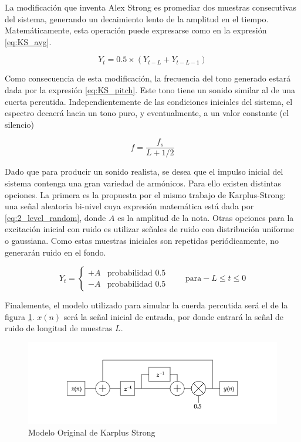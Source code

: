 La modificación que inventa Alex Strong es promediar dos muestras consecutivas del sistema, generando un decaimiento lento de la amplitud en el tiempo. Matemáticamente, esta operación puede expresarse como en la expresión \eqref{eq:KS_avg}.

\begin{equation}
    Y_t = 0.5\times \left(Y_{t-L}+Y_{t-L-1}\right)
    \label{eq:KS_avg}
\end{equation}

Como consecuencia de esta modificación, la frecuencia del tono generado estará dada por la expresión \eqref{eq:KS_pitch}. Este tono tiene un sonido similar al de una cuerta percutida. Independientemente de las condiciones iniciales del sistema, el espectro decaerá hacia un tono puro, y eventualmente, a un valor constante (el silencio)

\begin{equation}
    f = \frac{f_s}{L+1/2}
    \label{eq:KS_pitch}
\end{equation}

Dado que para producir un sonido realista, se desea que el impulso inicial del sistema contenga una gran variedad de armónicos. Para ello existen distintas opciones. La primera es la propuesta por el mismo trabajo de Karplus-Strong: una señal aleatoria bi-nivel cuya expresión matemática está dada por \eqref{eq:2_level_random}, donde $A$ es la amplitud de la nota. Otras opciones para la excitación inicial con ruido es utilizar señales de ruido con distribución uniforme o gaussiana. Como estas muestras iniciales son repetidas periódicamente, no generarán ruido en el fondo.

\begin{equation}
    Y_t = 
    \begin{cases}
        +A  &   \text{probabilidad 0.5}\\
        -A  &   \text{probabilidad 0.5}
    \end{cases}
    \qquad  \text{para} -L\leq t \leq 0
    \label{eq:2_level_random}
\end{equation}

Finalemente, el modelo utilizado para simular la cuerda percutida será el de la figura \ref{fig:ks_original}. $x(n)$ será la señal inicial de entrada, por donde entrará la señal de ruido de longitud de muestras $L$.

\begin{figure}[ht]
    \centering
    \includegraphics[width = \linewidth]{res/fig_ks.png}
    \caption{Modelo Original de Karplus Strong}
    \label{fig:ks_original}
\end{figure}

